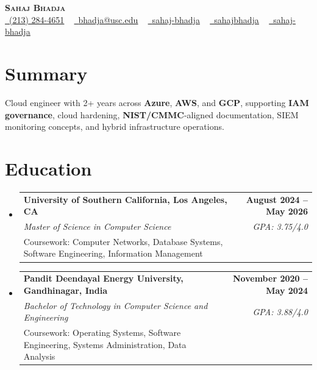 \documentclass[letterpaper,10pt]{article}
\makeatletter
\newcommand{\resumeEduSubheading}[5]{\vspace{-1pt}\item\begin{tabular*}{1.0\textwidth}[t]{l@{\extracolsep{\fill}}r}\textbf{#1} & \textbf{\small #2} \\\textit{\small #3} & \textit{\small #4} \\\small #5 & \\\end{tabular*}\vspace{-4pt}}
\newcommand{\resumeSubHeadingListStart}{\begin{itemize}[leftmargin=0.0in, label={}]}
\newcommand{\resumeSubHeadingListEnd}{\end{itemize}}
\makeatother
\begin{document}
\begin{center}
{\Huge \scshape \textbf{Sahaj Bhadja}} \\ \vspace{1pt}
\small \href{tel:(213) 284-4651}{\faPhone\ \underline{(213) 284-4651}} ~ \href{mailto:bhadja@usc.edu}{\raisebox{-0.2\height}\faEnvelope\ \underline{bhadja@usc.edu}} ~
\href{https://www.linkedin.com/in/sahaj-bhadja/}{\raisebox{-0.2\height}\faLinkedin\ \underline{sahaj-bhadja}} ~ \href{https://github.com/SAHAJ-BHADJA}{\raisebox{-0.2\height}\faGithub\ \underline{sahajbhadja}} ~
\href{https://sahaj-bhadja.vercel.app/}{\raisebox{-0.2\height}\faGlobe\ \underline{sahaj-bhadja}}
\end{center}
\vspace{-18pt}
\section{Summary}
\begin{itemize}[leftmargin=0.15in, label={}]
\small{\item{Cloud engineer with 2+ years across \textbf{Azure}, \textbf{AWS}, and \textbf{GCP}, supporting \textbf{IAM governance}, cloud hardening, \textbf{NIST/CMMC}-aligned documentation, SIEM monitoring concepts, and hybrid infrastructure operations.}}
\end{itemize}
\vspace{-16pt}
\section{Education}
\resumeSubHeadingListStart
\resumeEduSubheading{University of Southern California, Los Angeles, CA}{August 2024 -- May 2026}{Master of Science in Computer Science}{GPA: 3.75/4.0}{Coursework: Computer Networks, Database Systems, Software Engineering, Information Management}
\vspace{-9pt}
\resumeEduSubheading{Pandit Deendayal Energy University, Gandhinagar, India}{November 2020 -- May 2024}{Bachelor of Technology in Computer Science and Engineering}{GPA: 3.88/4.0}{Coursework: Operating Systems, Software Engineering, Systems Administration, Data Analysis}
\resumeSubHeadingListEnd
\vspace{-14pt}
\end{document}
